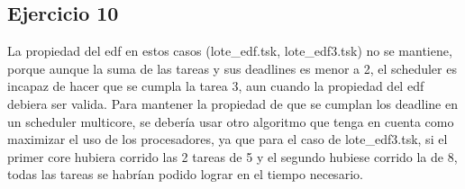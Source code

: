 \subsection{Ejercicio 10}
La propiedad del edf en estos casos (lote\_edf.tsk, lote\_edf3.tsk) no se mantiene, porque aunque la suma de las tareas y sus deadlines es menor a 2, el scheduler es incapaz de hacer que se cumpla la tarea 3, aun cuando la propiedad del edf debiera ser valida.
Para mantener la propiedad de que se cumplan los deadline en un scheduler multicore, se debería usar otro algoritmo que tenga en cuenta como maximizar el uso de los procesadores, ya que para el caso de lote\_edf3.tsk, si el primer core hubiera corrido las 2 tareas de 5 y el segundo hubiese corrido la de 8, todas las tareas se habrían podido lograr en el tiempo necesario.